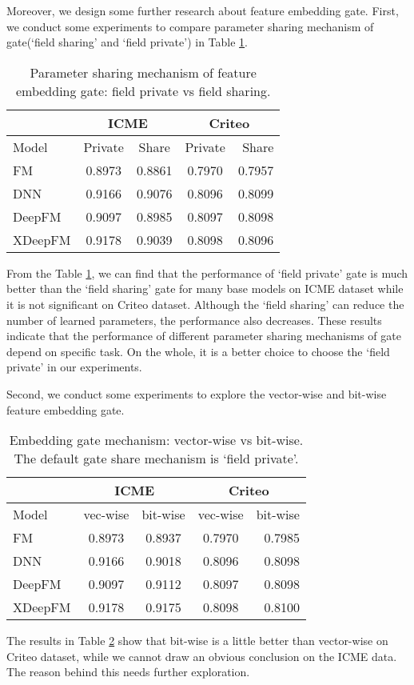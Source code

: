 \documentclass[sigconf,nonacm=true]{acmart}
\begin{document}
Moreover, we design some further research about feature embedding gate. 
First, we conduct some experiments to compare parameter sharing mechanism of gate(`field sharing' and `field private') in Table \ref{table:t2}.
\begin{table}[!htbp]
  \caption{Parameter sharing mechanism of feature embedding gate: field private vs field sharing.}
  \label{table:t2}
  \centering
  \begin{tabular}{lcccr}
    \toprule
     &\multicolumn{2}{c}{ICME}&\multicolumn{2}{c}{Criteo}\\
    \hline
     Model & Private & Share & Private & Share \\
    \midrule
FM & 0.8973 & 0.8861 & 0.7970 & 0.7957\tabularnewline
DNN & 0.9166 & 0.9076 & 0.8096 & 0.8099\tabularnewline
DeepFM & 0.9097 & 0.8985 & 0.8097 & 0.8098\tabularnewline
XDeepFM & 0.9178 & 0.9039 & 0.8098 & 0.8096\tabularnewline
  \bottomrule
\end{tabular}
\end{table}

From the Table \ref{table:t2}, we can find that the performance of `field private' gate is much better than the `field sharing' gate for many base models on ICME dataset while it is not significant on Criteo dataset.
Although the `field sharing' can reduce the number of learned parameters, the performance also decreases. 
These results indicate that the performance of different parameter sharing mechanisms of gate depend on specific task. 
On the whole, it is a better choice to choose the `field private' in our experiments. 

Second, we conduct some experiments to explore the vector-wise and bit-wise feature embedding gate.
\begin{table}[!htbp]
  \caption{Embedding gate mechanism: vector-wise vs bit-wise. The default gate share mechanism is `field private'.}
  \label{table:t3}
  \centering
  \begin{tabular}{lcccr}
    \toprule
     &\multicolumn{2}{c}{ICME}&\multicolumn{2}{c}{Criteo}\\
    \hline
     Model & vec-wise & bit-wise & vec-wise & bit-wise \\
    \midrule
FM & 0.8973 & 0.8937 & 0.7970 & 0.7985\tabularnewline
DNN & 0.9166 & 0.9018 & 0.8096 & 0.8098\tabularnewline
DeepFM & 0.9097 & 0.9112 & 0.8097 & 0.8098\tabularnewline
XDeepFM & 0.9178 & 0.9175 & 0.8098 & 0.8100\tabularnewline
  \bottomrule
\end{tabular}
\end{table}
The results in Table \ref{table:t3} show that bit-wise is a little better than vector-wise on Criteo dataset, while we cannot draw an obvious conclusion on the ICME data. 
The reason behind this needs further exploration.
\end{document}

